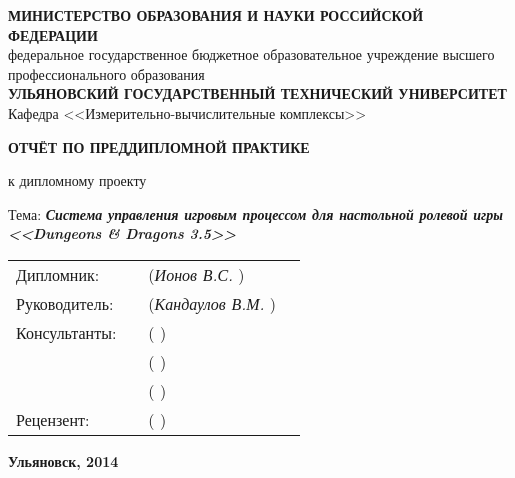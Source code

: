 \begin{titlepage}

\sffamily


\small
\begin{center}

\MakeTextUppercase{\textbf{министерство образования и науки российской федерации}}\\
федеральное государственное бюджетное образовательное учреждение высшего профессионального образования\\
\MakeTextUppercase{\textbf{ульяновский государственный технический университет}}\\[0.7cm]

Кафедра <<Измерительно-вычислительные комплексы>>\\[0.7cm]

\vspace{1.5cm}

\LARGE

\textbf{ОТЧЁТ ПО ПРЕДДИПЛОМНОЙ ПРАКТИКЕ}

\Large

к дипломному проекту\\[0.7cm]

\normalsize

Тема: \textbf{\textit{\emph{Система управления игровым процессом для настольной ролевой игры <<Dungeons \& Dragons 3.5>>}}}

\vspace{2cm}

\begin{tabular}{l m{6cm} m{5cm} l}
    Дипломник:    & \emph{\hfill} & (\emph{Ионов В.С.\hfill}     )  & \\[0.5cm]
    Руководитель: & \emph{\hfill} & (\emph{Кандаулов В.М.\hfill} )  & \\[0.5cm]
    Консультанты: & \emph{\hfill} & (\emph{\hfill}               )  & \\[0.5cm]
                  & \emph{\hfill} & (\emph{\hfill}               )  & \\[0.5cm]
                  & \emph{\hfill} & (\emph{\hfill}               )  & \\[0.5cm]
    Рецензент:    & \emph{\hfill} & (\emph{\hfill}               )  & \\
\end{tabular}

\vfill

\textbf{Ульяновск, 2014}

\end{center}

\end{titlepage}

\restoregeometry
